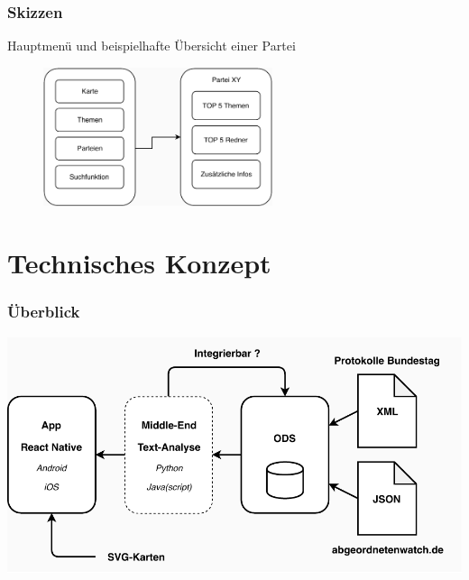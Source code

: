\documentclass{beamer}
\begin{document}
    \begin{frame}
      \frametitle{Skizzen}
      \centering
      Hauptmenü und beispielhafte Übersicht einer Partei
      \vspace{1cm}
      \centering
      \begin{figure}[h!]
        \centering\includegraphics[width=0.6\textwidth]{fig/mockup2.pdf}
      \end{figure}
    \end{frame}


  \section{Technisches Konzept}
    \begin{frame}
      \frametitle{Überblick}
      \centering
      \includegraphics[width=\textwidth]{fig/tech.pdf}
    \end{frame}
\end{document}
